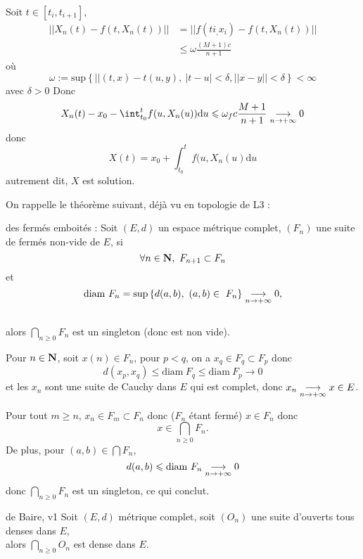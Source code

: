 \documentclass[a4paper,11pt, twoside]{article}
\begin{document}
\begin{Proof}
  Soit $t\in[t_i,t_{i+1}]$,
  \begin{align*}
    ||X_n(t)-f(t,X_n(t))||&=||f(ti_,x_i)-f(t,X_n(t))||\\
    &\leqslant \omega \frac{(M+1)c}{n+1}
  \end{align*}
  où 
  $$\omega :=\mathrm{sup}\left\{||(t,x)-t(u,y),\ |t-u|<\delta, ||x-y||<\delta\right\}<\infty$$
  avec $\delta>0$
  Donc 
  $$X_n(t)-x_0-\int_{t_0}^tf(u,X_n(u))\mathrm du\leqslant \omega_fc\frac{M+1}{n+1}\tend 0$$
  donc 
  $$X(t)=x_0+\int_{t_0}^tf(u,X_n(u)\mathrm du$$
  autrement dit, $X$ est solution.
\end{Proof}





\setcounter{prop}{0}





On rappelle le théorème suivant, déjà vu en topologie de L3 : 

\begin{thC}{des fermés emboités :}
  Soit $(E,d)$ un espace métrique complet, $(F_n)$ une suite de fermés non-vide de $E$, si
  $$\forall n\in\mathbf N,\ F_{n+1}\subset F_n$$
  et
  $$\mathrm{diam}\ F_n=\mathrm{sup}\left\{d(a,b),\ (a,b)\in\ F_n\right\}\tend 0,$$\\

  alors $\bigcap_{n\geqslant 0}F_n$ est un singleton (donc est non vide).
\end{thC}

\begin{Proof}
  Pour $n\in\mathbf N$, soit $x(n)\in F_n$, pour $p<q$, on a $x_q\in F_q\subset F_p$ donc 
  $$d(x_p,x_q)\leqslant \mathrm{diam}\ F_q\leqslant \mathrm{diam}\ F_p\longrightarrow 0$$
  et les $x_n$ sont une suite de Cauchy dans $E$ qui est complet, donc $x_n\underset{n\to+\infty}{\longrightarrow} x\in E$.

  Pour tout $m\geqslant n$, $x_n\in F_m\subset F_n$ donc ($F_n$ étant fermé) $x\in F_n$ donc 
  $$x\in \bigcap_{n\geqslant 0}F_n.$$
  De plus, pour $(a,b)\in \bigcap F_n$, 
  $$d(a,b)\leqslant \mathrm{diam}\ F_n\underset{n\to+\infty}{\longrightarrow} 0$$
  donc $\bigcap_{n\geqslant 0} F_n$ est un singleton, ce qui conclut.
\end{Proof}


\begin{thC}{de Baire, v1}
  Soit $(E,d)$ métrique complet, soit $(O_n)$ une suite d'ouverts tous denses dans $E$,\\

  alors 
  $\bigcap_{n\geqslant 0}O_n$ est dense dans $E$.
\end{thC}
\end{document}

